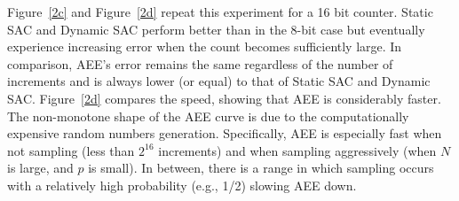 Figure~\ref{2c} and Figure~\ref{2d} repeat this experiment for a 16 bit counter. Static SAC and Dynamic SAC perform better than in the 8-bit case but eventually experience increasing error when the count becomes sufficiently large. In comparison, AEE's error remains the same regardless of the number of increments and is always lower (or equal) to that of Static SAC and Dynamic SAC. Figure~\ref{2d} compares the speed, 
showing that AEE is considerably faster. The non-monotone shape of the AEE curve is due to the computationally expensive random numbers generation. Specifically, AEE is especially fast when not sampling (less than $2^{16}$ increments) and when sampling aggressively (when $N$ is large, and $p$ is small). In between, there is a range in which sampling occurs with a relatively high probability (e.g., 1/2) slowing AEE down. 


 
